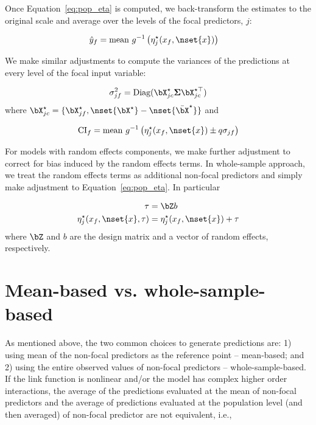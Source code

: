 Once Equation~\ref{eq:pop_eta} is computed, we back-transform the estimates to the original scale and average over the levels of the focal predictors, $j$:

\begin{align}\label{eq:pop_response} 
\hat{y}_f  &= \textrm{mean} ~ g^{-1} \left(\eta_j^\star(x_f, \nset{x})\right)
\end{align}

We make similar adjustments to compute the variances of the predictions at every level of the focal input variable:

\begin{align}
\sigma_{jf}^2 = \textrm{Diag}(\bX^\star_{jc} \boldsymbol{\Sigma} \bX^{\star\top}_{jc})
\end{align}
where $\bX^{\star}_{jc} = \{\bX_{jf}^\star, \nset{{\bX}^\star} - \nset{{\bar{\bX}}^\star}\}$ and 

\begin{align}
\mathrm{CI}_f = \mathrm{mean} ~ g^{-1} \left(\eta_j^\star(x_f, \nset{x}) \pm q\sigma_{jf}\right)
\end{align}

For models with random effects components, we make further adjustment to correct for bias induced by the random effects terms. In whole-sample approach, we treat the random effects terms as additional non-focal predictors and simply make adjustment to Equation~\ref{eq:pop_eta}. In particular

\begin{align}\label{eq:pop_eta_re} 
\tau &= \bZ b \nonumber \\
\eta_j^\star(x_f, \nset{x}, \tau)  &= \eta_j^\star(x_f, \nset{x}) + \tau
\end{align}
where $\bZ$ and $b$ are the design matrix and a vector of random effects, respectively.

\section{Mean-based vs. whole-sample-based}

As mentioned above, the two common choices to generate predictions are: 1) using mean of the non-focal predictors as the reference point -- mean-based; and 2) using the entire observed values of non-focal predictors -- whole-sample-based. If the link function is nonlinear and/or the model has complex higher order interactions, the average of the predictions evaluated at the mean of non-focal predictors and the average of predictions evaluated at the population level (and then averaged) of non-focal predictor are not equivalent, i.e.,

